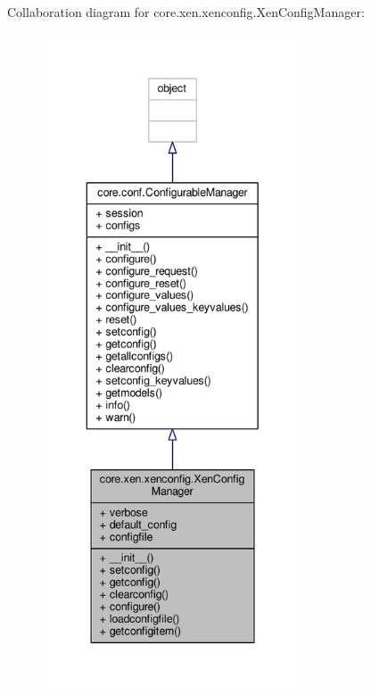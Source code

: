 Collaboration diagram for core.\+xen.\+xenconfig.\+Xen\+Config\+Manager\+:
\nopagebreak
\begin{figure}[H]
\begin{center}
\leavevmode
\includegraphics[height=550pt]{classcore_1_1xen_1_1xenconfig_1_1_xen_config_manager__coll__graph}
\end{center}
\end{figure}
